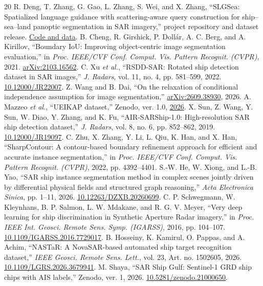 \documentclass[journal]{IEEEtran}
\begin{document}
\begin{thebibliography}{20}
 R. Deng, T. Zhang, G. Gao, L. Zhang, S. Wei, and X. Zhang, ``SLGSea: Spatialized language guidance with scattering-aware query construction for ship--sea--land panoptic segmentation in SAR imagery,'' project repository and dataset release. \href{https://github.com/deng1218/SLGSea}{Code and data}.
 B. Cheng, R. Girshick, P. Doll{\'a}r, A. C. Berg, and A. Kirillov, ``Boundary IoU: Improving object-centric image segmentation evaluation,'' in \emph{Proc. IEEE/CVF Conf. Comput. Vis. Pattern Recognit. (CVPR)}, 2021. \href{https://arxiv.org/abs/2103.16562}{arXiv:2103.16562}.
 C. Xu \emph{et al.}, ``RSDD-SAR: Rotated ship detection dataset in SAR images,'' \emph{J. Radars}, vol. 11, no. 4, pp. 581--599, 2022. \href{https://doi.org/10.12000/JR22007}{10.12000/JR22007}.
 Z. Wang and B. Dai, ``On the relaxation of conditional independence assumption for image segmentation,'' \href{https://arxiv.org/abs/2609.38930}{arXiv:2609.38930}, 2026.
 A. Mazzeo \emph{et al.}, ``UEIKAP dataset,'' Zenodo, ver. 1.0, \href{https://doi.org/10.5281/zenodo.18391027}{2026}.
 X. Sun, Z. Wang, Y. Sun, W. Diao, Y. Zhang, and K. Fu, ``AIR-SARShip-1.0: High-resolution SAR ship detection dataset,'' \emph{J. Radars}, vol. 8, no. 6, pp. 852--862, 2019. \href{https://doi.org/10.12000/JR19097}{10.12000/JR19097}.
 C. Zhu, X. Zhang, Y. Li, L. Qiu, K. Han, and X. Han, ``SharpContour: A contour-based boundary refinement approach for efficient and accurate instance segmentation,'' in \emph{Proc. IEEE/CVF Conf. Comput. Vis. Pattern Recognit. (CVPR)}, 2022, pp. 4392--4401.
 S.-W. He, W. Xiong, and L.-B. Yao, ``SAR ship instance segmentation method in complex scenes jointly driven by differential physical fields and structured graph reasoning,'' \emph{Acta Electronica Sinica}, pp. 1--11, 2026. \href{https://doi.org/10.12263/DZXB.20260699}{10.12263/DZXB.20260699}.
 C. P. Schwegmann, W. Kleynhans, B. P. Salmon, L. W. Mdakane, and R. G. V. Meyer, ``Very deep learning for ship discrimination in Synthetic Aperture Radar imagery,'' in \emph{Proc. IEEE Int. Geosci. Remote Sens. Symp. (IGARSS)}, 2016, pp. 104--107. \href{https://doi.org/10.1109/IGARSS.2016.7729017}{10.1109/IGARSS.2016.7729017}.
 B. Hosseiny, K. Kamirul, O. Pappas, and A. Achim, ``NASTaR: A NovaSAR-based automated ship target recognition dataset,'' \emph{IEEE Geosci. Remote Sens. Lett.}, vol. 23, Art. no. 1502605, 2026. \href{https://doi.org/10.1109/LGRS.2026.3679941}{10.1109/LGRS.2026.3679941}.
 M. Shaya, ``SAR Ship Gulf: Sentinel-1 GRD ship chips with AIS labels,'' Zenodo, ver. 1, 2026. \href{https://doi.org/10.5281/zenodo.21000650}{10.5281/zenodo.21000650}.
\end{thebibliography}
\end{document}
